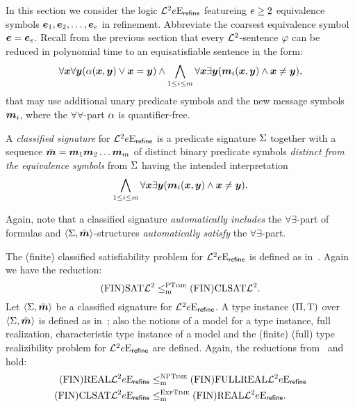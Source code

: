In this section we consider the logic $\mathcal{L}^{2}_{{}}{e}\mathrm{E}_{\mathsf{refine}}$
featureing $e \geq 2$ equivalence symbols $\bm{e}_{1},\bm{e}_{2},\dots,\bm{e}_{e}$ in
refinement. Abbreviate the coarsest equivalence symbol $\bm{e} = \bm{e}_{e}$.
Recall from the previous section that every $\mathcal{L}^{2}$-sentence $\varphi$ can be
reduced in polynomial time to an equisatisfiable sentence in the form:
\begin{equation*}
  \forall\bm{x}\forall\bm{y} (\alpha(\bm{x},\bm{y}) \lor \bm{x} = \bm{y}) \land
  \bigwedge_{1 \leq i \leq m} \forall\bm{x}\exists\bm{y}
  (\bm{m}_{i}(\bm{x},\bm{y}) \land \bm{x} \neq \bm{y}),
\end{equation*}
that may use additional unary predicate symbols and the new message symbols
$\bm{m}_{i}$, where the $\forall\forall$-part $\alpha$ is quantifier-free.
\begin{definition}
A \emph{classified signature} for $\mathcal{L}^{2}_{{}}{e}\mathrm{E}_{\mathsf{refine}}$ is a
predicate signature $\mathrm{\Sigma}$ together with a sequence $\sms =
\smm1\smm2\dots\smm\nm$ of distinct binary predicate symbols \emph{distinct
from the equivalence symbols} from $\mathrm{\Sigma}$ having the intended interpretation
\begin{equation*}
  \bigwedge_{1 \leq i \leq m} \forall\bm{x}\exists\bm{y} 
  (\bm{m}_{i}(\bm{x},\bm{y}) \land \bm{x} \neq \bm{y}).
\end{equation*}
\end{definition}
Again, note that a classified signature \emph{automatically includes} the
$\forall\exists$-part of formulas and $\left\langle \mathrm{\Sigma},\bar{\bm{m}} \right\rangle$-structures
\emph{automatically satisfy} the $\forall\exists$-part.

The (finite) classified satisfiability problem for
$\mathcal{L}^{2}_{{}}{e}\mathrm{E}_{\mathsf{refine}}$ is defined as in~.
Again we have the reduction:
\[
  \mathrm{(FIN)SAT}\mathcal{L}^{2} \leq_{\mathrm{m}}^{\text{\normalfont{\scshape PTime}}} \mathrm{(FIN)CLSAT}\mathcal{L}^{2}.
\]
Let $\left\langle \mathrm{\Sigma},\bar{\bm{m}} \right\rangle$ be a classified signature for
$\mathcal{L}^{2}_{{}}{e}\mathrm{E}_{\mathsf{refine}}$.
A type instance $(\Pi,\mathrm{T})$ over $\left\langle \mathrm{\Sigma},\bar{\bm{m}} \right\rangle$ is defined as
in~; also the notions of a model for a type instance,
full realization, characteristic type instance of a model and the (finite)
(full) type realizibility problem for $\mathcal{L}^{2}_{{}}{e}\mathrm{E}_{\mathsf{refine}}$ are
defined. Again, the reductions from~
and~ hold:
\begin{align*}
  \mathrm{(FIN)REAL}\mathcal{L}^{2}_{{}}{e}\mathrm{E}_{\mathsf{refine}} &\leq_{\mathrm{m}}^{\text{\normalfont{\scshape NPTime}}} 
  \mathrm{(FIN)FULLREAL}\mathcal{L}^{2}_{{}}{e}\mathrm{E}_{\mathsf{refine}} \\
  \mathrm{(FIN)CLSAT}\mathcal{L}^{2}_{{}}{e}\mathrm{E}_{\mathsf{refine}} &\leq_{\mathrm{m}}^{\text{\normalfont{\scshape ExpTime}}}
  \mathrm{(FIN)REAL}\mathcal{L}^{2}_{{}}{e}\mathrm{E}_{\mathsf{refine}}.
\end{align*}
